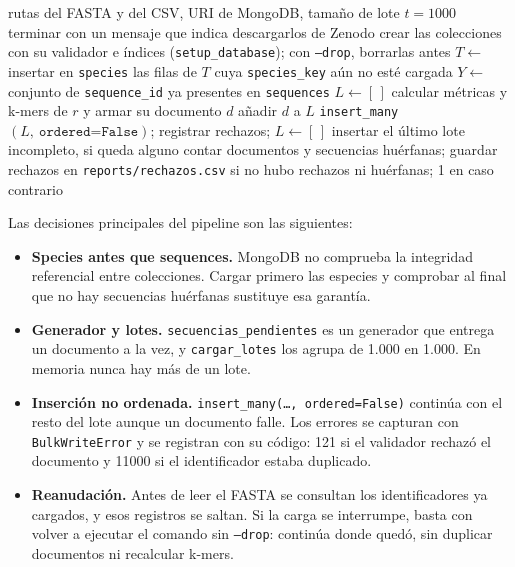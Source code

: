 \documentclass[pdflatex,lineno,referee,sn-vancouver-num]{sn-jnl}
\theoremstyle{thmstyleone}%
\theoremstyle{thmstyletwo}%
\theoremstyle{thmstylethree}%
\begin{document}
\begin{algorithm}[htbp]
  \caption{Carga de PanTEon en MongoDB (\texttt{cargar\_todo.py})}
  \label{alg:carga}
  \begin{algorithmic}[1]
    \Require rutas del FASTA y del CSV, URI de MongoDB, tamaño de lote $t=1000$
      \State terminar con un mensaje que indica descargarlos de Zenodo
    \EndIf
    \State crear las colecciones con su validador e índices (\texttt{setup\_database}); con \texttt{--drop}, borrarlas antes
    \State $T \gets$ 
    \State insertar en \texttt{species} las filas de $T$ cuya \texttt{species\_key} aún no esté cargada
    \State $Y \gets$ conjunto de \texttt{sequence\_id} ya presentes en \texttt{sequences}
    \State $L \gets [\,]$
        \State calcular métricas y k-mers de $r$ y armar su documento $d$
        \State añadir $d$ a $L$
          \State \texttt{insert\_many}$(L,\ \texttt{ordered=False})$; registrar rechazos; $L \gets [\,]$
        \EndIf
      \EndIf
    \EndFor
    \State insertar el último lote incompleto, si queda alguno
    \State contar documentos y secuencias huérfanas; guardar rechazos en \texttt{reports/rechazos.csv}
    \State {} si no hubo rechazos ni huérfanas; 1 en caso contrario
  \end{algorithmic}
\end{algorithm}

Las decisiones principales del pipeline son las siguientes:

\begin{itemize}
  \item \textbf{Species antes que sequences.} MongoDB no comprueba la integridad referencial entre colecciones. Cargar primero las especies y comprobar al final que no hay secuencias huérfanas sustituye esa garantía.
  \item \textbf{Generador y lotes.} \texttt{secuencias\_pendientes} es un generador que entrega un documento a la vez, y \texttt{cargar\_lotes} los agrupa de 1.000 en 1.000. En memoria nunca hay más de un lote.
  \item \textbf{Inserción no ordenada.} \texttt{insert\_many(\ldots, ordered=False)} continúa con el resto del lote aunque un documento falle. Los errores se capturan con \texttt{BulkWriteError} y se registran con su código: 121 si el validador rechazó el documento y 11000 si el identificador estaba duplicado.
  \item \textbf{Reanudación.} Antes de leer el FASTA se consultan los identificadores ya cargados, y esos registros se saltan. Si la carga se interrumpe, basta con volver a ejecutar el comando sin \texttt{--drop}: continúa donde quedó, sin duplicar documentos ni recalcular k-mers.
\end{itemize}
\end{document}
